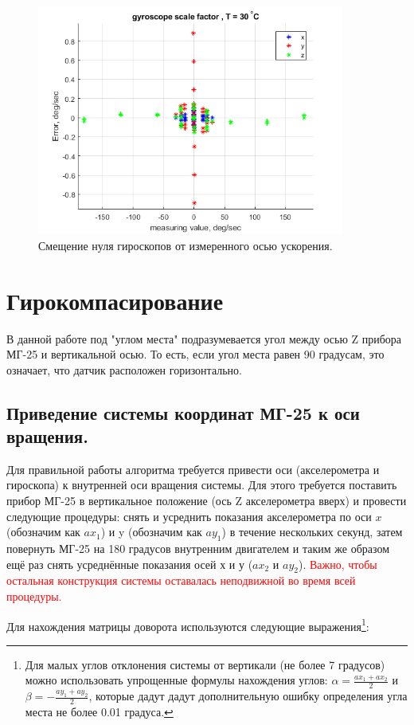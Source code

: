 \documentclass[a4paper,12pt]{article}
\begin{document}
\begin{figure}
\centering
\includegraphics[width=0.9\textwidth]{gyros_errors_dots.png} 
\caption{\label{fig:gyros_errors_dots}   Смещение нуля гироскопов от измеренного осью ускорения.}
\end{figure}



\section{Гирокомпасирование}
В данной работе под "углом места" подразумевается угол между осью Z прибора МГ-25 и вертикальной осью. То есть, если угол места равен 90 градусам, это означает, что датчик расположен горизонтально.
\subsection{Приведение системы координат МГ-25 к оси вращения.}

Для правильной работы алгоритма требуется привести оси (акселерометра и гироскопа) к внутренней оси вращения системы. Для этого требуется поставить прибор МГ-25 в вертикальное положение (ось Z акселерометра вверх) и провести следующие процедуры: снять и усреднить показания акселерометра по оси $x$ (обозначим как $ax_1$) и y (обозначим как $ay_1$) в течение нескольких секунд, затем повернуть МГ-25 на 180 градусов внутренним двигателем и таким же образом ещё раз снять усреднённые показания осей х и у ($ax_2$ и $ay_2$).   \textcolor{red}{ Важно, чтобы остальная конструкция системы оставалась неподвижной во время всей процедуры.}



Для нахождения матрицы доворота используются следующие выражения\footnote{Для малых углов отклонения системы от вертикали (не более 7 градусов) можно использовать упрощенные формулы нахождения углов: $\alpha = \frac{ax_1+ax_2}{2}$ и $\beta = - \frac{ay_1+ay_2}{2}$, которые дадут дадут дополнительную ошибку определения угла места не более 0.01 градуса. }:
\end{document}
